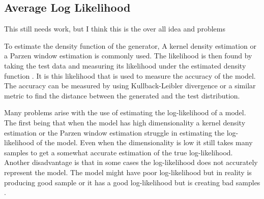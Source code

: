 \subsection{Average Log Likelihood}
\label{sub:Average Log Likelihoodt}

\begin{comment}

 Kernel density estimation and Parzen window estimation are used to estimate the density function of a distribution from samples.
 You take samples from your generator and 
 With the estimated density function defined you can use the Kullback-Leibler divergence or similar metrics to calculate the distance between the generated distribution and distribution of the test data.
 
 It doesn't work well :D lol
 when the data has high dimensionality a Parzen Window struggles to produce the true log-likelihood of a model.(AKA it is not very accurate)
 If the dimesnsionality is low still requires lots of samples to come close to the true log-likelihood.
 
 Because can't really estimate the log-likelihood very well even if dimensions is small.
 
\end{comment}

This still needs work, but I think this is the over all idea and problems

 To estimate the density function of the generator, A kernel density estimation or a Parzen window estimation is commonly used.
 The likelihood is then found by taking the test data and measuring its likelihood under the estimated density function \cite{eghbal2017likelihood}.
 It is this likelihood that is used to measure the accuracy of the model.
 The accuracy can be measured by using Kullback-Leibler divergence or a similar metric to find the distance between the generated and the test distribution.
 
 Many problems arise with the use of estimating the log-likelihood of a model.
 The first being that when the model has high dimensionality a kernel density estimation or the Parzen window estimation struggle in estimating the log-likelihood of the model.
 Even when the dimensionality is low it still takes many samples to get a somewhat accurate estimation of the true log-likelihood.
 Another disadvantage is that in some cases the log-likelihood does not accurately represent the model.
 The model might have poor log-likelihood but in reality is producing good sample or it has a good log-likelihood but is creating bad samples \cite{borji2018pros}.
 